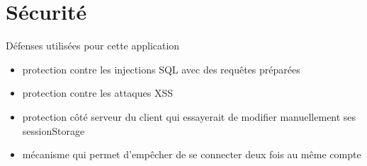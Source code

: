 \documentclass{beamer}
\begin{document}
\section{Sécurité}

\begin{frame}

\begin{alertblock}{Défenses utilisées pour cette application} 
	\begin{itemize}
		[circle]
		\item protection contre les injections SQL avec des requêtes préparées
		\item protection contre les attaques XSS
		\item protection côté serveur du client qui essayerait de modifier manuellement ses sessionStorage
		\item mécanisme qui permet d'empêcher de se connecter deux fois au même compte
	\end{itemize}
\end{alertblock}
\end{frame}
\end{document}
